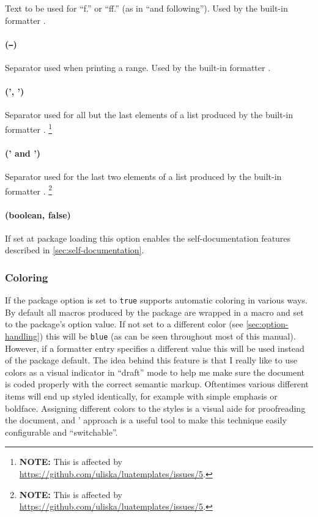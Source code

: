 \documentclass{scrartcl}
\begin{document}
Text to be used for “f.” or “ff.” (as in “and following”).  Used by the built-in formatter .


\paragraph{ (\texttt{--})}

Separator used when printing a range.  Used by the built-in formatter .


\paragraph{ (', ')}

Separator used for all but the last elements of a list produced by the built-in formatter
.%
\footnote{\textbf{NOTE:} This is affected by
\url{https://github.com/uliska/luatemplates/issues/5}.}


\paragraph{ (' and ')}

Separator used for the last two elements of a list produced by the built-in formatter
.%
\footnote{\textbf{NOTE:} This is affected by
\url{https://github.com/uliska/luatemplates/issues/5}.}


\paragraph{ (boolean, false)}

If set at package loading this option enables the self-documentation features
described in \vref{sec:self-documentation}.


\subsubsection{Coloring}
\label{sec:coloring}

If the package option  is set to \texttt{true}
 supports automatic coloring in various ways.  By default
all macros produced by the package are wrapped in a  macro and
set to the package's  option value.  If not set to a
different color (see \vref{sec:option-handling}) this will be \texttt{blue}
(as can be seen throughout most of this manual).  However, if a formatter entry
specifies a different  value this will be used instead of the
package default.  The idea behind this feature is that I really like to use
colors as a visual indicator in “draft” mode to help me make sure the document
is coded properly with the correct semantic markup.  Oftentimes various
different items will end up styled identically, for example with simple emphasis
or boldface.  Assigning different colors to the styles is a visual aide for
proofreading the document, and ' approach is a useful tool
to make this technique easily configurable and “switchable”.
\end{document}
